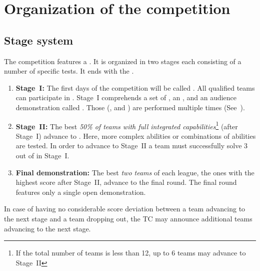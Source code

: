 \section{Organization of the competition}
\label{sec:procedure_during_competition}

\subsection{Stage system}\label{rule:stages}

The competition features a . It is organized in two stages each consisting of a number of specific tests. It ends with the .

\begin{enumerate}
	\item \textbf{Stage~I:} The first days of the competition will be called .
	All qualified teams can participate in . Stage~I comprehends a set of , an , and an audience demonstration called .
	Those  (, and ) are performed multiple times (See~).

	\item \textbf{Stage~II:} The best \emph{50\% of teams with full integrated capabilities}\footnote{If the total number of teams is less than 12, up to 6 teams may advance to Stage~II} (after Stage~I) advance to . Here, more complex abilities or combinations of abilities are tested. In order to advance to Stage~II a team must successfully solve 3 out of  in Stage~I. \\
	\item \textbf{Final demonstration:} The best \emph{two teams} of each league, the ones with the highest score after Stage~II, advance to the final round. The final round features only a single open demonstration.
\end{enumerate}

In case of having no considerable score deviation between a team advancing to the next stage and a team dropping out, the TC may announce additional teams advancing to the next stage.


